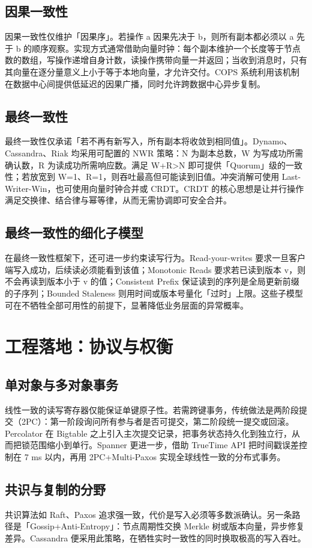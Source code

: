\section{因果一致性}
因果一致性仅维护「因果序」。若操作 a 因果先决于 b，则所有副本都必须以 a 先于 b 的顺序观察。实现方式通常借助向量时钟：每个副本维护一个长度等于节点数的数组，写操作递增自身计数，读操作携带向量一并返回；当收到消息时，只有其向量在逐分量意义上小于等于本地向量，才允许交付。COPS 系统利用该机制在数据中心间提供低延迟的因果广播，同时允许跨数据中心异步复制。\par
\section{最终一致性}
最终一致性仅承诺「若不再有新写入，所有副本将收敛到相同值」。Dynamo、Cassandra、Riak 均采用可配置的 NWR 策略：N 为副本总数，W 为写成功所需确认数，R 为读成功所需响应数。满足 W+R>N 即可提供「Quorum」级的一致性；若放宽到 W=1、R=1，则吞吐最高但可能读到旧值。冲突消解可使用 Last-Writer-Win，也可使用向量时钟合并或 CRDT。CRDT 的核心思想是让并行操作满足交换律、结合律与幂等律，从而无需协调即可安全合并。\par
\section{最终一致性的细化子模型}
在最终一致性框架下，还可进一步约束读写行为。Read-your-writes 要求一旦客户端写入成功，后续读必须能看到该值；Monotonic Reads 要求若已读到版本 v，则不会再读到版本小于 v 的值；Consistent Prefix 保证读到的序列是全局更新前缀的子序列；Bounded Staleness 则用时间或版本号量化「过时」上限。这些子模型可在不牺牲全部可用性的前提下，显著降低业务层面的异常概率。\par
\chapter{工程落地：协议与权衡}
\section{单对象与多对象事务}
线性一致的读写寄存器仅能保证单键原子性。若需跨键事务，传统做法是两阶段提交（2PC）：第一阶段询问所有参与者是否可提交，第二阶段统一提交或回滚。Percolator 在 Bigtable 之上引入主次提交记录，把事务状态持久化到独立行，从而把锁范围缩小到单行。Spanner 更进一步，借助 TrueTime API 把时间戳误差控制在 7 ms 以内，再用 2PC+Multi-Paxos 实现全球线性一致的分布式事务。\par
\section{共识与复制的分野}
共识算法如 Raft、Paxos 追求强一致，代价是写入必须等多数派确认。另一条路径是「Gossip+Anti-Entropy」：节点周期性交换 Merkle 树或版本向量，异步修复差异。Cassandra 便采用此策略，在牺牲实时一致性的同时换取极高的写入吞吐。\par
